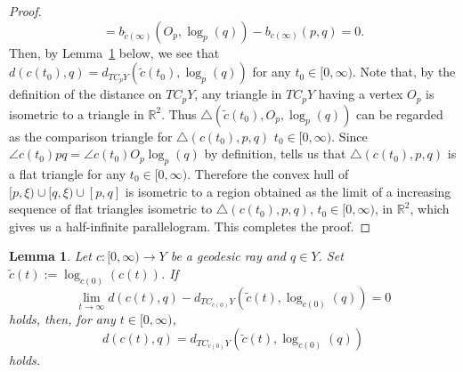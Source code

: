 \documentclass[12pt]{amsart}
\numberwithin{equation}{section}
\theoremstyle{plain}
\newtheorem{Lemma}[Theorem]{Lemma}
\theoremstyle{definition}
\theoremstyle{remark}
\newcommand{\R}{{\mathbb R}}
\newcommand{\tcprj}{\log}
\newcommand{\tri}[3]{\triangle(#1,#2,#3)}
\begin{document}
\begin{proof}
\begin{equation*}
   = b_{\tilde c(\infty)}(O_p,\tcprj_p(q))-b_{c(\infty)}(p,q)
   = 0. 
 \end{equation*}
 Then, by Lemma~\ref{angle_nondecreasing} below, we see that 
 $d(c(t_0),q)=d_{TC_pY}(\tilde c(t_0), \tcprj_p(q))$ for any 
 $t_0 \in [0,\infty)$.  Note that, by the definition of the distance on
 $TC_pY$,  any triangle in $TC_pY$ having a vertex $O_p$ is isometric to
 a triangle in $\R^2$. Thus
 $\tri{\tilde c(t_0)}{O_p}{\tcprj_p(q)}$ can be regarded as the
 comparison triangle for $\tri{c(t_0)}{p}{q}$ $t_0 \in [0,\infty)$. 
 Since $\angle c(t_0)pq = \angle c(t_0) O_p \tcprj_p(q)$ by definition, 
 \cite[p.~180, 2.9 Proposition]{bridson-haefliger} tells us that  
 $\tri{c(t_0)}{p}{q}$ is a flat triangle for any $t_0 \in [0,\infty)$. 
 Therefore the convex hull of $[p, \xi)\cup [q, \xi) \cup [p, q]$ is
 isometric to a region obtained as the limit of a increasing sequence of
 flat triangles isometric to $\tri{c(t_0)}{p}{q}$, $t_0 \in [0,\infty)$, 
 in $\R^2$, which gives us a half-infinite parallelogram. 
 This completes the proof. 
\end{proof}

\begin{Lemma}
\label{angle_nondecreasing}
 Let $c\colon [0,\infty) \rightarrow Y$ be a geodesic ray and $q \in Y$. 
 Set $\tilde c (t):=\tcprj_{c(0)}(c(t))$. If 
\begin{equation*}
\lim_{t\to \infty}
d(c(t),q)-d_{TC_{c(0)}Y}(\tilde c(t),\tcprj_{c(0)}(q))=0
\end{equation*}
 holds, then, for any $t \in [0,\infty)$,
 \begin{equation*}
 d(c(t),q)=d_{TC_{c(0)}Y}(\tilde c(t),\tcprj_{c(0)}(q))
 \end{equation*}
 holds. 
\end{Lemma}
\end{document}
